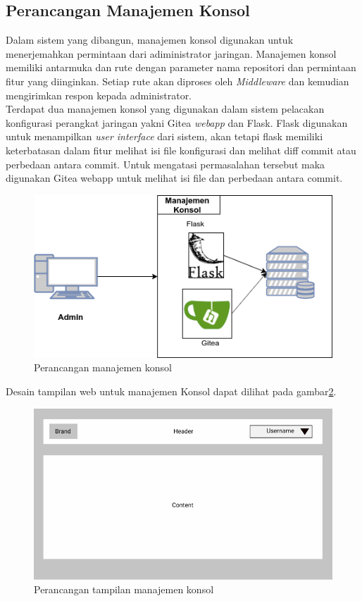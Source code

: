         \subsection{Perancangan Manajemen Konsol}
        	Dalam sistem yang dibangun, manajemen konsol digunakan untuk menerjemahkan permintaan dari adiministrator jaringan. Manajemen konsol memiliki antarmuka dan rute dengan parameter nama repositori dan permintaan fitur yang diinginkan. Setiap rute akan diproses oleh \textit{Middleware} dan kemudian mengirimkan respon kepada administrator.\\
        	\indent Terdapat dua manajemen konsol yang digunakan dalam sistem pelacakan konfigurasi perangkat jaringan yakni Gitea \textit{webapp} dan Flask. Flask digunakan untuk menampilkan \textit{user interface} dari sistem, akan tetapi flask memiliki keterbatasan dalam fitur melihat isi file konfigurasi dan melihat diff commit atau perbedaan antara commit. Untuk mengatasi permasalahan tersebut maka digunakan Gitea webapp untuk melihat isi file dan perbedaan antara commit.   
         	\begin{figure}[H]
         		\centering
         		\includegraphics[width=\textwidth]{Images/C-3/Manajemen-Konsol.png}
         		\caption{Perancangan manajemen konsol}
         		\label{ManajemenKonsol}
         	\end{figure}
         	
         	Desain tampilan web untuk manajemen Konsol dapat dilihat pada gambar\ref{ManajemenKonsolUI}.
         		\begin{figure}[H]
         		\centering
         		\includegraphics[width=\textwidth]{Images/C-3/desainui.png}
         		\caption{Perancangan tampilan manajemen konsol}
         		\label{ManajemenKonsolUI}
         	\end{figure}
         
